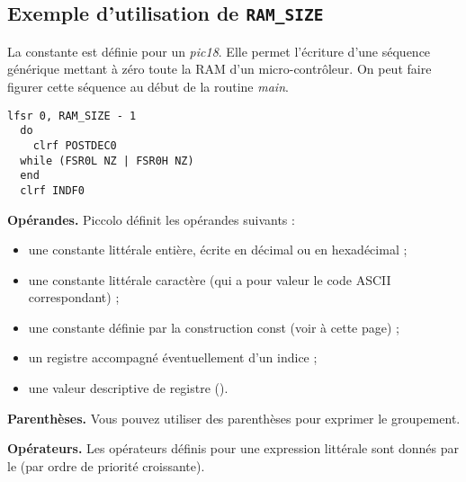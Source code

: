 \subsection{Exemple d'utilisation de \texttt{RAM\_SIZE}}

La constante  est définie pour un \emph{pic18}. Elle permet l'écriture d'une séquence générique mettant à zéro toute la RAM d'un micro-contrôleur. On peut faire figurer cette séquence au début de la routine \emph{main}.


\begin{lstlisting}[language=piccolo]
  lfsr 0, RAM_SIZE - 1
  do
    clrf POSTDEC0
  while (FSR0L NZ | FSR0H NZ)
  end
  clrf INDF0
\end{lstlisting}



\textbf{Opérandes.} Piccolo définit les opérandes suivants :
\begin{itemize}
  \item une constante littérale entière, écrite en décimal ou en hexadécimal ;
  \item une constante littérale caractère (qui a pour valeur le code ASCII correspondant) ;
  \item une constante définie par la construction const (voir à cette page) ;
  \item un registre accompagné éventuellement d’un indice ;
  \item une valeur descriptive de registre ().
\end{itemize}

\textbf{Parenthèses.} Vous pouvez utiliser des parenthèses pour exprimer le groupement.

\textbf{Opérateurs.} Les opérateurs définis pour une expression littérale sont donnés par le  (par ordre de priorité croissante).

